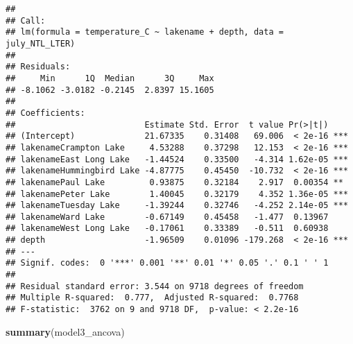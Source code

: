 \documentclass[]{article}
\newenvironment{Shaded}{\begin{snugshade}}{\end{snugshade}}
\newcommand{\KeywordTok}[1]{\textcolor[rgb]{0.13,0.29,0.53}{\textbf{#1}}}
\newcommand{\NormalTok}[1]{#1}
\begin{document}
\begin{verbatim}
## 
## Call:
## lm(formula = temperature_C ~ lakename + depth, data = july_NTL_LTER)
## 
## Residuals:
##     Min      1Q  Median      3Q     Max 
## -8.1062 -3.0182 -0.2145  2.8397 15.1605 
## 
## Coefficients:
##                          Estimate Std. Error  t value Pr(>|t|)    
## (Intercept)              21.67335    0.31408   69.006  < 2e-16 ***
## lakenameCrampton Lake     4.53288    0.37298   12.153  < 2e-16 ***
## lakenameEast Long Lake   -1.44524    0.33500   -4.314 1.62e-05 ***
## lakenameHummingbird Lake -4.87775    0.45450  -10.732  < 2e-16 ***
## lakenamePaul Lake         0.93875    0.32184    2.917  0.00354 ** 
## lakenamePeter Lake        1.40045    0.32179    4.352 1.36e-05 ***
## lakenameTuesday Lake     -1.39244    0.32746   -4.252 2.14e-05 ***
## lakenameWard Lake        -0.67149    0.45458   -1.477  0.13967    
## lakenameWest Long Lake   -0.17061    0.33389   -0.511  0.60938    
## depth                    -1.96509    0.01096 -179.268  < 2e-16 ***
## ---
## Signif. codes:  0 '***' 0.001 '**' 0.01 '*' 0.05 '.' 0.1 ' ' 1
## 
## Residual standard error: 3.544 on 9718 degrees of freedom
## Multiple R-squared:  0.777,  Adjusted R-squared:  0.7768 
## F-statistic:  3762 on 9 and 9718 DF,  p-value: < 2.2e-16
\end{verbatim}

\begin{Shaded}
\begin{Highlighting}[]
\KeywordTok{summary}\NormalTok{(model3_ancova)}
\end{Highlighting}
\end{Shaded}
\end{document}
